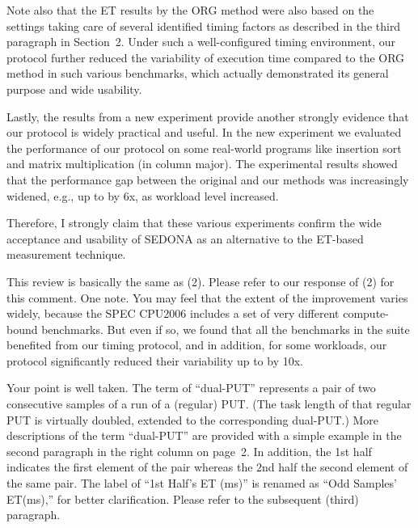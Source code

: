 \documentclass[10pt,letterpaper]{article}
\newenvironment{myindentpar}[1]%
{\begin{list}{}
         {\vspace{10pt}
					\setlength{\leftmargin}{#1}}
          \item[]
}
{\end{list}}
\newcommand{\rev}[1]{\begin{myindentpar}{.25in} {\em {\color{blue}{#1}}}\end{myindentpar}}
\begin{document}
Note also that the ET results by the ORG method were also based 
on the settings taking care of several identified timing factors as
described in the third paragraph in Section~2.
Under such a well-configured timing environment, our protocol further 
reduced the variability of execution time compared to the ORG method
in such various benchmarks, 
which actually demonstrated its general purpose and wide usability. 

Lastly, the results from a new experiment provide 
another strongly evidence that our protocol is widely practical and useful. 
In the new experiment we evaluated the performance of our protocol 
on some real-world programs like insertion sort and matrix multiplication (in column major). 
The experimental results showed that the performance gap between the original and our methods 
was increasingly widened, e.g., up to by 6x, as workload level increased. 

Therefore, I strongly claim that these various experiments confirm 
the wide acceptance and usability of SEDONA as an alternative to the ET-based measurement technique. 

\rev{ 
(3) The improvement of the SEDONA is little. And the extent of the each
benchmark’s improvement described in Table 3 varies widely. Thus, the
experimental results does not confirm whether the SEDONA is widely
practical or is useful.
}

This review is basically the same as (2). Please refer to our response of (2) for this comment. 
One note. You may feel that the extent of the improvement varies widely, 
because the SPEC CPU2006 includes a set of very different compute-bound benchmarks. 
But even if so, we found that all the benchmarks in the suite benefited from our timing protocol, 
and in addition, for some workloads, our protocol significantly reduced their variability up to by 10x.  


\rev{ 
(4) Since the explanation of ``dual-PUT'' is not enough, I can not well
understand the algorithm shown in Fig. 3. Similarly, what is “1st
Half’s ET (ms)” attached at Fig. 4(b), 4(c), 4(d) ? I understood only that
the label is related with “dual-PUT”. These words are important in the
manuscript. So, please keep in mind to write understandably.
}

Your point is well taken. 
The term of ``dual-PUT'' represents 
a pair of two consecutive samples of a run of a (regular) PUT. 
(The task length of that regular PUT is virtually doubled, extended to the corresponding 
dual-PUT.) More descriptions of the term ``\hbox{dual-PUT}'' are provided with a simple example in the second paragraph in the right column on page~2. 
In addition, the 1st half indicates the first element of the pair 
whereas the 2nd half the second element of the same pair. 
The label of ``1st Half's ET (ms)'' is renamed as ``Odd Samples' ET(ms),'' 
for better clarification. Please refer to the subsequent (third) paragraph. 
\end{document}
